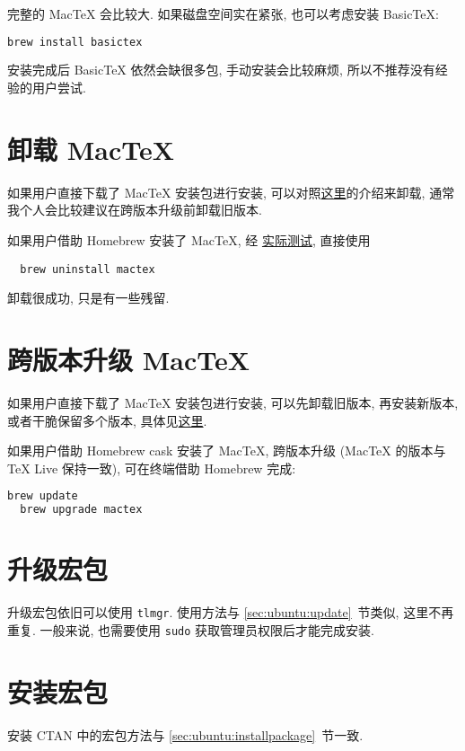 完整的 Mac\TeX{} 会比较大. 如果磁盘空间实在紧张, 也可以考虑安装 Basic\TeX:
\begin{lstlisting}[language=bash]
  brew install basictex
\end{lstlisting}
安装完成后 Basic\TeX{} 依然会缺很多包, 手动安装会比较麻烦, 所以不推荐没有经验的用户尝试.

\section{卸载 Mac\TeX}

如果用户直接下载了 Mac\TeX{} 安装包进行安装,
可以对照\href{https://www.tug.org/mactex/uninstalling.html}{这里}的介绍来卸载,
通常我个人会比较建议在跨版本升级前卸载旧版本.

如果用户借助 Homebrew 安装了 Mac\TeX,
经%
\href{https://github.com/OsbertWang/install-latex-guide-zh-cn/pull/39#discussion_r1368152254}{实际测试},
直接使用
\begin{lstlisting}
  brew uninstall mactex
\end{lstlisting}
卸载很成功,
只是有一些残留.

\section{跨版本升级 Mac\TeX}

如果用户直接下载了 Mac\TeX{} 安装包进行安装,
可以先卸载旧版本,
再安装新版本,
或者干脆保留多个版本,
具体见\href{https://www.tug.org/mactex/multipletexdistributions.html}{这里}.

如果用户借助 Homebrew cask 安装了 Mac\TeX,
跨版本升级 (Mac\TeX{} 的版本与 \TeX{} Live 保持一致), 可在\textsf{终端}借助 Homebrew 完成:
\begin{lstlisting}[language=bash]
  brew update
  brew upgrade mactex
\end{lstlisting}

\section{升级宏包}

升级宏包依旧可以使用 \texttt{tlmgr}.
使用方法与 \ref{sec:ubuntu:update}~节类似, 这里不再重复.
一般来说, 也需要使用 \texttt{sudo} 获取管理员权限后才能完成安装.

\section{安装宏包}

安装 CTAN 中的宏包方法与 \ref{sec:ubuntu:installpackage}~节一致.

